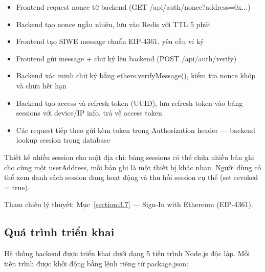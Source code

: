 \documentclass[../DoAn.tex]{subfiles}
\begin{document}
\begin{itemize}
  \item Frontend request nonce từ backend (GET /api/auth/nonce?address=0x...)
  \item Backend tạo nonce ngẫu nhiên, lưu vào Redis với TTL 5 phút
  \item Frontend tạo SIWE message chuẩn EIP-4361, yêu cầu ví ký
  \item Frontend gửi message + chữ ký lên backend (POST /api/auth/verify)
  \item Backend xác minh chữ ký bằng ethers.verifyMessage(), kiểm tra nonce khớp và chưa hết hạn
  \item Backend tạo access và refresh token (UUID), lưu refresh token vào bảng sessions với device/IP info, trả về access token
  \item Các request tiếp theo gửi kèm token trong Authorization header --- backend lookup session trong database
\end{itemize}


Thiết kế nhiều session cho một địa chỉ: bảng sessions có thể chứa nhiều bản ghi cho cùng một userAddress, mỗi bản ghi là một thiết bị khác nhau. Người dùng có thể xem danh sách session đang hoạt động và thu hồi session cụ thể (set revoked = true).

Tham chiếu lý thuyết: Mục~\ref{section:3.7} --- Sign-In with Ethereum (EIP-4361).


\subsection{Quá trình triển khai}


Hệ thống backend được triển khai dưới dạng 5 tiến trình Node.js độc lập. Mỗi tiến trình được khởi động bằng lệnh riêng từ package.json:

\begin{table}[H]
\centering
{}
\caption{Khởi động các tiến trình}
\end{table}
\end{document}
